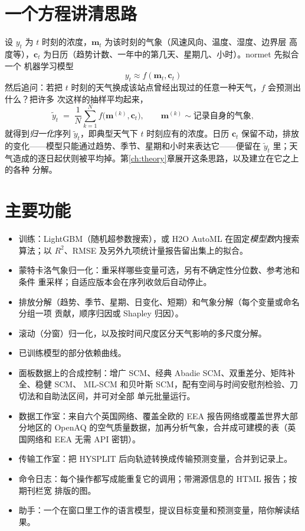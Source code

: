 \documentclass[11pt]{ctexrep}
\newcommand{\nosep}{\setlength{\itemsep}{0pt}\setlength{\parskip}{0pt}\setlength{\topsep}{2pt}}
\newcommand{\nm}{\textsf{normet}}
\begin{document}
\section{一个方程讲清思路}
设 $y_t$ 为 $t$ 时刻的浓度，$\mathbf{m}_t$ 为该时刻的气象（风速风向、温度、湿度、边界层
高度等），$\mathbf{c}_t$ 为日历（趋势计数、一年中的第几天、星期几、小时）。\nm{} 先拟合一个
机器学习模型
\begin{equation}
  y_t \approx f(\mathbf{m}_t, \mathbf{c}_t)
\end{equation}
然后追问：若把 $t$ 时刻的天气换成该站点曾经出现过的任意一种天气，$f$ 会预测出什么？把许多
次这样的抽样平均起来，
\begin{equation}
  \tilde{y}_t \;=\; \frac{1}{N}\sum_{k=1}^{N} f\bigl(\mathbf{m}^{(k)}, \mathbf{c}_t\bigr),
  \qquad \mathbf{m}^{(k)} \sim \text{记录自身的气象},
  \label{eq:norm}
\end{equation}
就得到\emph{归一化}序列 $\tilde{y}_t$，即典型天气下 $t$ 时刻应有的浓度。日历 $\mathbf{c}_t$
保留不动，排放的变化——模型只能通过趋势、季节、星期和小时来表达它——便留在 $\tilde{y}_t$
里；天气造成的逐日起伏则被平均掉。第\ref{ch:theory}章展开这条思路，以及建立在它之上的各种
分解。

\section{主要功能}
\begin{itemize}\nosep
  \item 训练：LightGBM（随机超参数搜索），或 H2O AutoML 在固定\emph{模型数}内搜索算法；以
        $R^2$、RMSE 及另外九项统计量报告留出集上的拟合。
  \item 蒙特卡洛气象归一化：重采样哪些变量可选，另有不确定性分位数、参考池和条件
        重采样；自适应版本会在序列收敛后自动停止。
  \item 排放分解（趋势、季节、星期、日变化、短期）和气象分解（每个变量或命名分组一项
        贡献，顺序归因或 Shapley 归因）。
  \item 滚动（分窗）归一化，以及按时间尺度区分天气影响的多尺度分解。
  \item 已训练模型的部分依赖曲线。
  \item 面板数据上的合成控制：增广 SCM、经典 Abadie SCM、双重差分、矩阵补全、稳健 SCM、
        ML-SCM 和贝叶斯 SCM，配有空间与时间安慰剂检验、刀切法和自助法区间，并可对全部
        单元批量运行。
  \item 数据工作室：来自六个英国网络、覆盖全欧的 EEA 报告网络或覆盖世界大部分地区的
        OpenAQ 的空气质量数据，加再分析气象，合并成可建模的表（英国网络和 EEA 无需
        API 密钥）。
  \item 传输工作室：把 HYSPLIT 后向轨迹转换成传输预测变量，合并到记录上。
  \item 命令日志：每个操作都写成能重复它的调用；带溯源信息的 HTML 报告；按期刊栏宽
        排版的图。
  \item 助手：一个在窗口里工作的语言模型，提议目标变量和预测变量，陪你解读结果。
\end{itemize}
\end{document}
